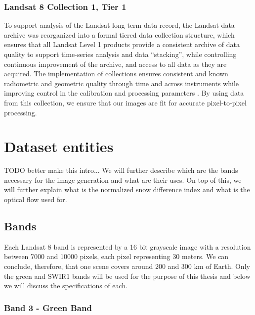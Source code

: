 \documentclass[11pt, a4paper]{report}
\begin{document}
	\subsubsection{Landsat 8 Collection 1, Tier 1}
	
	To support analysis  of the Landsat long-term data record, the Landsat data archive was reorganized  into a formal tiered data collection  structure, which ensures that all Landsat Level 1 products provide a consistent archive of data quality to support time-series analysis and data “stacking”, while controlling continuous improvement of the archive, and access to all data as they are acquired. The implementation of collections ensures consistent and known radiometric and geometric quality through time and across instruments while improving control in the calibration and processing parameters \cite{lc1l1}. By using data from this collection, we ensure that our images are fit for accurate pixel-to-pixel processing.
	
	\section{Dataset entities}
	
	TODO better make this intro...
	We will further describe which are the bands necessary for the image generation and what are their uses. On top of this, we will further explain what is the normalized snow difference index and what is the optical flow used for.
	
	\subsection{Bands}
	
	Each Landsat 8 band is represented by a 16 bit grayscale image with a resolution between 7000 and 10000 pixels, each pixel representing 30 meters. We can conclude, therefore, that one scene covers around 200 and 300 km of Earth. Only the green and SWIR1 bands will be used for the purpose of this thesis and below we will discuss the specifications of each. 
	
	\subsubsection{Band 3 - Green Band}
	
\end{document}
